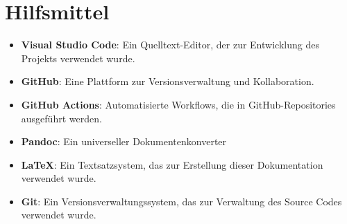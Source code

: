 \section*{Hilfsmittel}
\begin{itemize}
    \item \textbf{Visual Studio Code}: Ein Quelltext-Editor, der zur Entwicklung des Projekts verwendet wurde.
    \item \textbf{GitHub}: Eine Plattform zur Versionsverwaltung und Kollaboration.
    \item \textbf{GitHub Actions}: Automatisierte Workflows, die in GitHub-Repositories ausgeführt werden.
    \item \textbf{Pandoc}: Ein universeller Dokumentenkonverter
    \item \textbf{LaTeX}: Ein Textsatzsystem, das zur Erstellung dieser Dokumentation verwendet wurde.
    \item \textbf{Git}: Ein Versionsverwaltungssystem, das zur Verwaltung des Source Codes verwendet wurde.
\end{itemize}